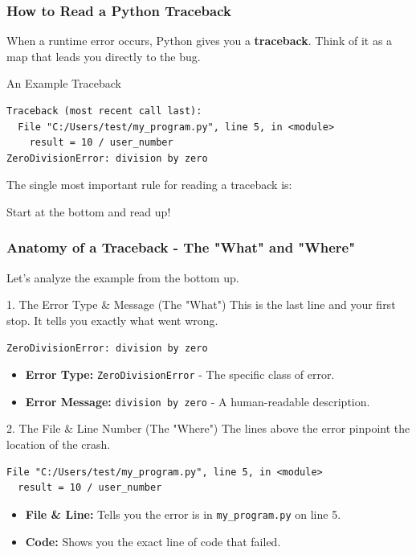 \documentclass{beamer}
\begin{document}
\begin{frame}[fragile]
    \frametitle{How to Read a Python Traceback}
    When a runtime error occurs, Python gives you a \textbf{traceback}. Think of it as a map that leads you directly to the bug.

    \begin{block}{An Example Traceback}
\begin{verbatim}
Traceback (most recent call last):
  File "C:/Users/test/my_program.py", line 5, in <module>
    result = 10 / user_number
ZeroDivisionError: division by zero
\end{verbatim}
    \end{block}

    \vspace{1em}
    The single most important rule for reading a traceback is:
    \begin{center}
        \Large\alert{Start at the bottom and read up!}
    \end{center}
\end{frame}

\begin{frame}[fragile]
    \frametitle{Anatomy of a Traceback - The "What" and "Where"}
    Let's analyze the example from the bottom up.

    \begin{block}{1. The Error Type \& Message (The "What")}
        This is the last line and your first stop. It tells you exactly what went wrong.
\begin{verbatim}
ZeroDivisionError: division by zero
\end{verbatim}
        \begin{itemize}
            \item \textbf{Error Type:} \texttt{ZeroDivisionError} - The specific class of error.
            \item \textbf{Error Message:} \texttt{division by zero} - A human-readable description.
        \end{itemize}
    \end{block}

    \begin{block}{2. The File \& Line Number (The "Where")}
        The lines above the error pinpoint the location of the crash.
\begin{verbatim}
File "C:/Users/test/my_program.py", line 5, in <module>
  result = 10 / user_number
\end{verbatim}
        \begin{itemize}
            \item \textbf{File \& Line:} Tells you the error is in \texttt{my\_program.py} on \alert{line 5}.
            \item \textbf{Code:} Shows you the exact line of code that failed.
        \end{itemize}
    \end{block}
\end{frame}
\end{document}
